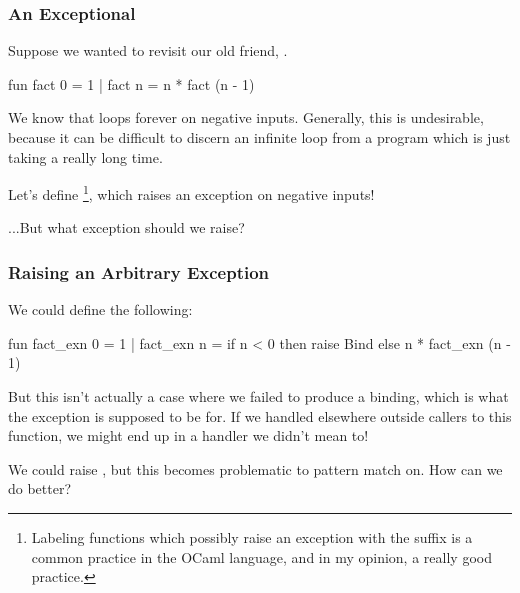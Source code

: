 \documentclass[aspectratio=169, handout]{beamer}
\begin{document}


\begin{frame}[fragile]
  \frametitle{An Exceptional }

  Suppose we wanted to revisit our old friend, .

  \begin{codeblock}
    fun fact 0 = 1
      | fact n = n * fact (n - 1)
  \end{codeblock}

  \pause
  \vspace{\fill}

  We know that  loops forever on negative inputs. Generally,
  this is undesirable, because it can be difficult to discern an infinite
  loop from a program which is just taking a really long time.

  \pause
  \vspace{\fill}

  Let's define \footnote{
    Labeling functions which possibly raise an exception
    with the suffix  is a common practice in the OCaml language,
    and in my opinion, a really good practice.
  }, which raises an exception on negative inputs!

  \pause
  \vspace{\fill}

  ...But what exception should we raise?
\end{frame}

\begin{frame}[fragile]
  \frametitle{Raising an Arbitrary Exception}

  We could define the following:
  \begin{codeblock}
    fun fact_exn 0 = 1
      | fact_exn n =
          if n < 0 then
            raise Bind
          else
            n * fact_exn (n - 1)
  \end{codeblock}

  \pause
  \vspace{\fill}

  But this isn't actually a case where we failed to produce a binding, which
  is what the  exception is supposed to be for. If we handled
   elsewhere outside callers to this function, we might end up
  in a handler we didn't mean to!

  \pause
  \vspace{\fill}

  We could raise , but this becomes problematic
  to pattern match on. How can we do better?
\end{frame}
\end{document}
